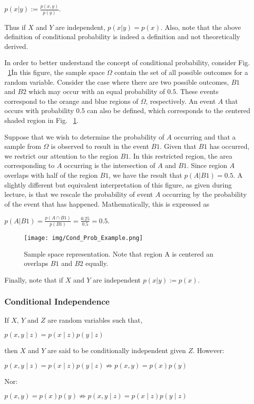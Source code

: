 \documentclass[twoside]{article}
\begin{document}
\begin{center}
$p(x|y):=\frac{p(x,y)}{p(y)}.$
\end{center}

Thus if $X$ and $Y$ are independent, $p(x|y)=p(x)$. Also, note that the above definition of conditional probability is indeed a definition and not theoretically derived.

In order to better understand the concept of conditional probability, consider Fig. ~\ref{fig:cond_prob_example}\. In this figure, the sample space $\Omega$ contain the set of all possible outcomes for a random variable. Consider the case where there are two possible outcomes, $B1$ and $B2$ which may occur with an equal probability of $0.5$. These events correspond to the orange and blue regions of $\Omega$, respectively. An event $A$ that occurs with probability $0.5$ can also be defined, which corresponds to the centered shaded region in Fig. ~\ref{fig:cond_prob_example}.

Suppose that we wish to determine the probability of $A$ occurring and that a sample from $\Omega$ is observed to result in the event $B1$. Given that $B1$ has occurred, we restrict our attention to the region $B1$. In this restricted region, the area corresponding to $A$ occurring is the intersection of $A$ and $B1$. Since region $A$ overlaps with half of the region $B1$, we have the result that $p(A|B1) = 0.5.$ A slightly different but equivalent interpretation of this figure, as given during lecture, is that we rescale the probability of event $A$ occurring by the probability of the event that has happened. Mathematically, this is expressed as

\begin{center}
$p(A|B1)=\frac{p(A \cap B1)}{p(B1)}=\frac{0.25}{0.5}=0.5.$
\end{center}

\begin{figure}[h!]
	\centering
    \texttt{[image: img/Cond\_Prob\_Example.png]}
    \caption{Sample space representation. Note that region A is centered an overlaps $B1$ and $B2$ equally.}
    \label{fig:cond_prob_example}
\end{figure}

Finally, note that if $X$ and $Y$ are independent $p(x|y):=p(x)$.
\subsubsection{Conditional Independence}
If $X$, $Y$ and $Z$ are random variables such that,
\begin{center}
$p(x,y \mid z)=p(x \mid z)p(y \mid z)$
\end{center}
then $X$ and $Y$ are said to be conditionally independent given $Z$. \newline
However:
\begin{center}
$p(x,y \mid z)=p(x \mid z)p(y \mid z) \not \Rightarrow p(x,y)=p(x)p(y)$
\end{center}
Nor:
\begin{center}
$p(x,y)=p(x)p(y) \not \Rightarrow p(x,y \mid z)=p(x \mid z)p(y \mid z)$
\end{center}
\end{document}
